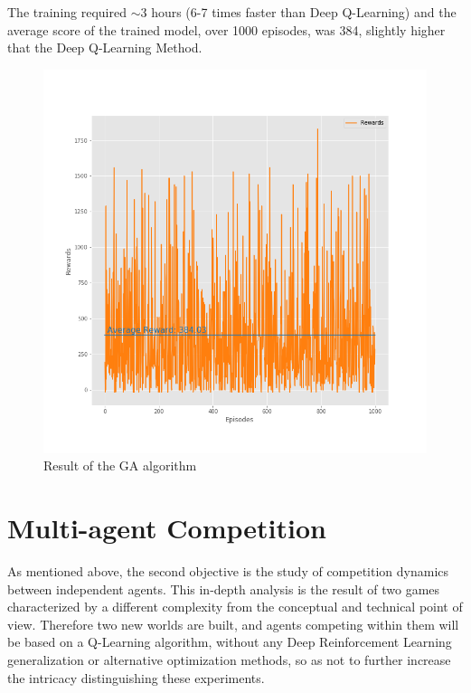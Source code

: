 The training required $\sim$3 hours (6-7 times faster than Deep Q-Learning) and the average score of the trained model, over 1000 episodes, was 384, slightly higher that the Deep Q-Learning Method.
\newpage
\begin{figure}[!h]
	\vspace{-1cm}
	\includegraphics[width=\linewidth]{./figs/deep_ga_test.png}
	\vspace{-1.5cm}
	\caption{Result of the GA algorithm}
	\vspace{-1.1cm}
\end{figure}
\section{Multi-agent Competition}
As mentioned above, the second objective is the study of competition dynamics between independent agents. This in-depth analysis is the result of two games characterized by a different complexity from the conceptual and technical point of view. Therefore two new worlds are built, and agents competing within them will be based on a Q-Learning algorithm, without any Deep Reinforcement Learning generalization or alternative optimization methods, so as not to further increase the intricacy distinguishing these experiments.
